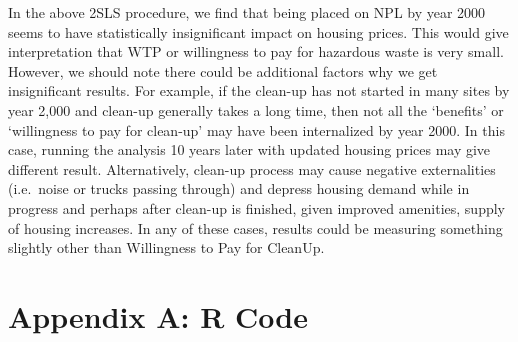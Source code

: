 \documentclass[
]{article}
\begin{document}
In the above 2SLS procedure, we find that being placed on NPL by year
2000 seems to have statistically insignificant impact on housing prices.
This would give interpretation that WTP or willingness to pay for
hazardous waste is very small. However, we should note there could be
additional factors why we get insignificant results. For example, if the
clean-up has not started in many sites by year 2,000 and clean-up
generally takes a long time, then not all the `benefits' or `willingness
to pay for clean-up' may have been internalized by year 2000. In this
case, running the analysis 10 years later with updated housing prices
may give different result. Alternatively, clean-up process may cause
negative externalities (i.e.~noise or trucks passing through) and
depress housing demand while in progress and perhaps after clean-up is
finished, given improved amenities, supply of housing increases. In any
of these cases, results could be measuring something slightly other than
Willingness to Pay for CleanUp.

\newpage

\hypertarget{appendix-a-r-code}{%
\section{Appendix A: R Code}\label{appendix-a-r-code}}
\end{document}
